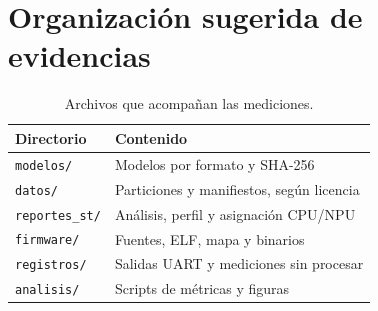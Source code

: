 \section{Organización sugerida de evidencias}
\begin{table}[H]\centering\small
\caption{Archivos que acompañan las mediciones.}
\begin{tabularx}{\linewidth}{p{4cm}Y}\toprule
Directorio & Contenido\\\midrule
\texttt{modelos/} & Modelos por formato y SHA-256\\
\texttt{datos/} & Particiones y manifiestos, según licencia\\
\texttt{reportes\_st/} & Análisis, perfil y asignación CPU/NPU\\
\texttt{firmware/} & Fuentes, ELF, mapa y binarios\\
\texttt{registros/} & Salidas UART y mediciones sin procesar\\
\texttt{analisis/} & Scripts de métricas y figuras\\\bottomrule
\end{tabularx}\end{table}
